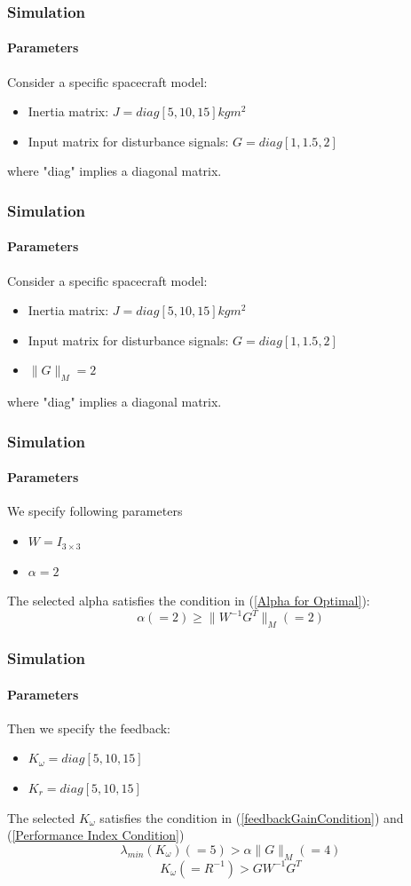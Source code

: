 \documentclass{beamer}
\begin{document}
\begin{frame}
\frametitle{Simulation}
\framesubtitle{Parameters}
Consider a specific spacecraft model:
\begin{itemize}
	\item Inertia matrix: $J=diag[5,10,15]kgm^{2}$
	\item Input matrix for disturbance signals: $G=diag[1,1.5,2]$
\end{itemize}
where "diag" implies a diagonal matrix. 
\end{frame}

\begin{frame}
\frametitle{Simulation}
\framesubtitle{Parameters}
Consider a specific spacecraft model:
\begin{itemize}
	\item Inertia matrix: $J=diag[5,10,15]kgm^{2}$
	\item Input matrix for disturbance signals: $G=diag[1,1.5,2]$
	\item $\lVert G\rVert_{M}=2$
\end{itemize}
where "diag" implies a diagonal matrix. 
\end{frame}

\begin{frame}
\frametitle{Simulation}
\framesubtitle{Parameters}
We specify following parameters
\begin{itemize}
	\item $W=I_{3\times 3}$
	\item $\alpha=2$
\end{itemize}
The selected alpha satisfies the condition in (\ref{Alpha for Optimal}):
$$\alpha(=2)\geq\lVert W^{-1}G^{T}\rVert_{M}(=2)$$
\end{frame}

\begin{frame}
\frametitle{Simulation}
\framesubtitle{Parameters}
Then we specify the feedback:
\begin{itemize}
	\item $K_{\omega}=diag[5,10,15]$
	\item $K_{r}=diag[5,10,15]$
\end{itemize}
The selected $K_{\omega}$ satisfies the condition in (\ref{feedbackGainCondition}) and (\ref{Performance Index Condition})
$$\lambda_{min}(K_{\omega})(=5)>\alpha\lVert G\rVert_{M}(=4)$$
$$K_{\omega}(=R^{-1})>GW^{-1}G^{T}$$
\end{frame}
\end{document}
